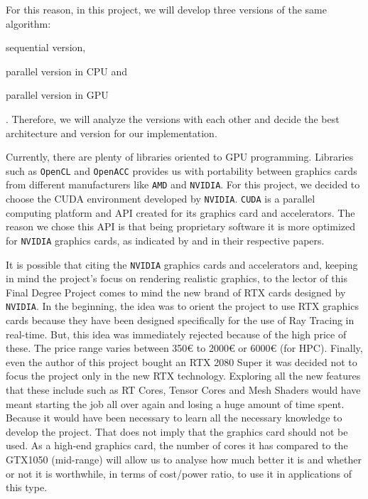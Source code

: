 \documentclass[titlepage,12pt]{article}
\begin{document}
For this reason, in this project, we will develop three versions of the same algorithm: \begin{enumerate*}[label=\roman*)] \item sequential version, \item parallel version in CPU and \item parallel version in GPU \end{enumerate*}. Therefore, we will analyze the versions with each other and decide the best architecture and version for our implementation.

Currently, there are plenty of libraries oriented to GPU programming. Libraries such as \texttt{OpenCL} and \texttt{OpenACC} provides us with portability between graphics cards from different manufacturers like \texttt{AMD} and \texttt{NVIDIA}. For this project, we decided to choose the CUDA environment developed by \texttt{NVIDIA}. \texttt{CUDA} is a parallel computing platform and API created for its graphics card and accelerators. The reason we chose this API is that being proprietary software it is more optimized for \texttt{NVIDIA} graphics cards, as indicated by \citep{Karimi2010} and \citep[pp.~216--215]{Fang2011} in their respective papers.

It is possible that citing the \texttt{NVIDIA} graphics cards and accelerators and, keeping in mind the project's focus on rendering realistic graphics, to the lector of this Final Degree Project comes to mind the new brand of RTX cards designed by \texttt{NVIDIA}. In the beginning, the idea was to orient the project to use RTX graphics cards because they have been designed specifically for the use of Ray Tracing in real-time. But, this idea was immediately rejected because of the high price of these. The price range varies between 350€ to 2000€ or 6000€ (for HPC). Finally, even the author of this project bought an RTX 2080 Super it was decided not to focus the project only in the new RTX technology. Exploring all the new features that these include such as RT Cores, Tensor Cores and Mesh Shaders would have meant starting the job all over again and losing a huge amount of time spent. Because it would have been necessary to learn all the necessary knowledge to develop the project. That does not imply that the graphics card should not be used. As a high-end graphics card, the number of cores it has compared to the GTX1050 (mid-range) will allow us to analyse how much better it is and whether or not it is worthwhile, in terms of cost/power ratio, to use it in applications of this type.
\end{document}
